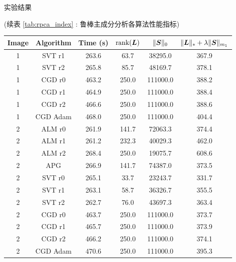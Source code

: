\documentclass{beamer}
\begin{document}
\begin{frame}{实验结果}
  \centerline{(续表 \ref{tab:rpca_index} : 鲁棒主成分分析各算法性能指标)}
  \begin{table}[H]
    \centering
    \scriptsize
    \begin{tabular}{cccccc}
      \toprule
      Image & Algorithm      & Time (s)  & $\operatorname{rank}(\bm{L})$ & $\|\bm{S}\|_0$    & $\|\bm{L}\|_{*}+\lambda\|\bm{S}\|_{m_1}$ \\
      \midrule
      1     & SVT r1    & 263.6    & 63.7        & 38295.0     & 367.9         \\
      1     & SVT r2    & 265.8    & 85.7        & 48169.7     & 378.1         \\
      1     & CGD r0    & 463.2    & 250.0       & 111000.0    & 388.2         \\
      1     & CGD r1    & 464.9    & 250.0       & 111000.0    & 388.4         \\
      1     & CGD r2    & 466.6    & 250.0       & 111000.0    & 388.6         \\
      1     & CGD Adam  & 468.0    & 250.0       & 111000.0    & 404.4         \\
      2     & ALM r0    & 261.9    & 141.7       & 72063.3     & 374.4         \\
      2     & ALM r1    & 261.2    & 232.3       & 40029.3     & 462.0         \\
      2     & ALM r2    & 268.4    & 250.0       & 19075.7     & 608.6         \\
      2     & APG       & 266.9    & 141.7       & 74387.0     & 373.5         \\
      2     & SVT r0    & 265.1    & 33.7        & 23243.7     & 331.7         \\
      2     & SVT r1    & 263.1    & 58.7        & 36326.7     & 355.5         \\
      2     & SVT r2    & 262.7    & 76.0        & 43697.3     & 363.4         \\
      2     & CGD r0    & 463.7    & 250.0       & 111000.0    & 373.7         \\
      2     & CGD r1    & 465.7    & 250.0       & 111000.0    & 373.9         \\
      2     & CGD r2    & 466.2    & 250.0       & 111000.0    & 374.1         \\
      2     & CGD Adam  & 470.6    & 250.0       & 111000.0    & 395.3        \\
      \bottomrule
    \end{tabular}
  \end{table}
\end{frame}
\end{document}
